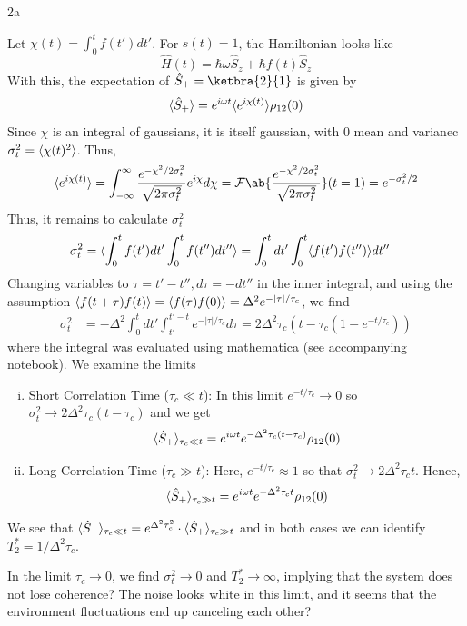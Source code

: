 \documentclass[12pt]{article}
\begin{document}
\newpage 
\begin{exc}{2a}
\end{exc}
\begin{ans}
    Let $\chi(t) = \int_0^t f(t')dt'$. For $s(t) = 1$, the Hamiltonian looks like 
    \[\hat H(t) = \hbar\omega \hat S_z + \hbar f(t) \hat S_z\]
    With this, the expectation of $\hat S_+ = \ketbra{2}{1}$ is given by
    \[\langle{\hat S_+}\rangle = e^{i\omega t} \langle{e^{i\chi(t)}}\rangle \rho_{12}(0)\]
    Since $\chi$ is an integral of gaussians, it is itself gaussian, with 0 mean and varianec $\sigma_t^2 = \langle{\chi(t)^2}\rangle$. Thus, 
    \[\ev{e^{i\chi(t)}} = \int_{-\infty}^\infty \frac{e^{-\chi^2/2\sigma_t^2}}{\sqrt{2\pi \sigma_t^2}}e^{i\chi} d\chi = \mathcal F\ab\{\frac{e^{-\chi^2/2\sigma_t^2}}{\sqrt{2\pi \sigma_t^2}}\}(t = 1) = e^{-\sigma_t^2/2}\]
    Thus, it remains to calculate $\sigma_t^2$
    \begin{align*}
        \sigma_t^2 &= \langle{\int_0^t f(t')dt' \int_0^t f(t'')dt''}\rangle = \int_0^t dt'\int_0^t \langle{f(t')f(t'')}\rangle dt''
    \end{align*}
    Changing variables to $\tau = t' - t'', d\tau = -dt''$ in the inner integral, and using the assumption $\langle{f(t + \tau)f(t)}\rangle = \langle{f(\tau)f(0)}\rangle = \Delta^2 e^{-|\tau|/\tau_c}$, we find 
    \begin{align*}
        \sigma_t^2 &= - \Delta^2  \int_0^t dt'\int_{t'}^{t' - t}e^{-|\tau|/\tau_c}d\tau = 2\Delta^2\tau_c(t - \tau_c(1 -  e^{-t/\tau_c}))
    \end{align*}
    where the integral was evaluated using mathematica (see accompanying notebook). We examine the limits 
    \begin{enumerate}[(i)]
        \item Short Correlation Time ($\tau_c \ll t$): In this limit $e^{-t/\tau_c} \to 0$ so $\sigma_t^2 \to 2\Delta^2 \tau_c(t - \tau_c)$ and we get 
        \[ 
        \langle{\hat S_+}\rangle_{\tau_c \ll t} = e^{i\omega t} e^{-\Delta^2 \tau_c(t - \tau_c)} \rho_{12}(0) 
        \]
        \item Long Correlation Time ($\tau_c \gg t$): Here, $e^{-t/\tau_c} \approx 1$ so that $\sigma_t^2 \to 2\Delta^2 \tau_c t$. Hence, 
        \[        
        \langle{\hat S_+}\rangle_{\tau_c \gg t} = e^{i\omega t} e^{-\Delta^2 \tau_c t} \rho_{12}(0)
        \]
    \end{enumerate}
    We see that $\langle{\hat S_+}\rangle_{\tau_c \ll t} =  e^{\Delta^2 \tau_c^2} \cdot \langle{\hat S_+}\rangle_{\tau_c \gg t}$ and in both cases we can identify $T^*_2 = 1/\Delta^2 \tau_c$. 

    In the limit $\tau_c \to 0$, we find $\sigma_t^2 \to 0$ and $T^*_2 \to \infty$, implying that the system does not lose coherence? The noise looks white in this limit, and it seems that the environment fluctuations end up canceling each other?
\end{ans}
\end{document}
